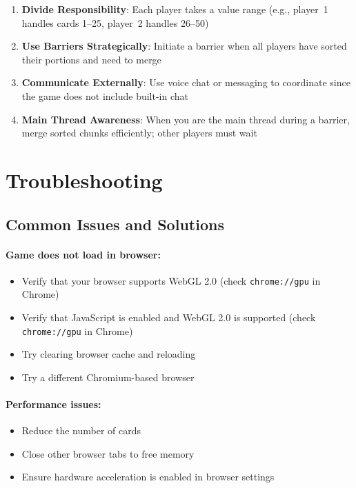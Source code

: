 \begin{enumerate}
    \item \textbf{Divide Responsibility}: Each player takes a value range (e.g., player~1 handles cards 1--25, player~2 handles 26--50)
    \item \textbf{Use Barriers Strategically}: Initiate a barrier when all players have sorted their portions and need to merge
    \item \textbf{Communicate Externally}: Use voice chat or messaging to coordinate since the game does not include built-in chat
    \item \textbf{Main Thread Awareness}: When you are the main thread during a barrier, merge sorted chunks efficiently; other players must wait
\end{enumerate}

\section{Troubleshooting}
\label{app:a:troubleshooting}

\subsection{Common Issues and Solutions}

\paragraph*{Game does not load in browser:}
\begin{itemize}
    \item Verify that your browser supports WebGL 2.0 (check \texttt{chrome://gpu} in Chrome)
    \item Verify that JavaScript is enabled and WebGL 2.0 is supported (check \texttt{chrome://gpu} in Chrome)
    \item Try clearing browser cache and reloading
    \item Try a different Chromium-based browser
\end{itemize}

\paragraph*{Performance issues:}
\begin{itemize}
    \item Reduce the number of cards
    \item Close other browser tabs to free memory
    \item Ensure hardware acceleration is enabled in browser settings
\end{itemize}

